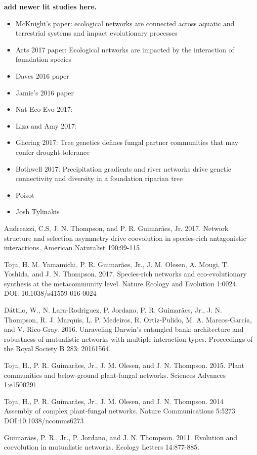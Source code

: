 \documentclass[fleqn,10pt]{wlscirep}
\begin{document}
\textbf{add newer lit studies here.}
\begin{itemize}
\item McKnight's paper: ecological networks are connected across
  aquatic and terrestrial systems and impact evolutionary processes
\item Arts 2017 paper: Ecological networks are impacted by the
  interaction of foundation species
\item Daves 2016 paper
\item Jamie's 2016 paper
\item Nat Eco Evo 2017:
\item Liza and Amy 2017: 
\item Ghering 2017: Tree genetics defines fungal partner communities
  that may confer drought tolerance
\item Bothwell 2017: Precipitation gradients and river networks drive
  genetic connectivity and diversity in a foundation riparian tree
\item Poisot
\item Josh Tylinakis

\end{itemize}

Andreazzi, C.S, J. N. Thompson, and P. R. Guimarães, Jr. 2017. Network
structure and selection asymmetry drive coevolution in species-rich
antagonistic interactions. American Naturalist 190:99-115

Toju, H. M. Yamamichi, P. R. Guimarães, Jr., J. M. Olesen, A. Mougi,
T. Yoshida, and J. N. Thompson. 2017. Species-rich networks and
eco-evolutionary synthesis at the metacommunity level. Nature Ecology
and Evolution 1:0024. DOI: 10.1038/s41559-016-0024

Dáttilo, W., N. Lara-Rodriguez, P. Jordano, P. R. Guimarães, Jr.,
J. N. Thompson, R. J. Marquis, L. P. Medeiros, R. Ortiz-Pulido,
M. A. Marcos-García, and V. Rico-Gray. 2016. Unraveling Darwin's
entangled bank: architecture and robustness of mutualistic networks
with multiple interaction types. Proceedings of the Royal Society B
283: 20161564.

Toju, H., P. R. Guimarães, Jr., J. M. Olesen, and
J. N. Thompson. 2015. Plant communities and below-ground plant-fungal
networks. Sciences Advances 1:e1500291

Toju, H., P. R. Guimarães, Jr., J. M. Olesen, and J. N. Thompson. 2014
Assembly of complex plant-fungal networks. Nature Communications
5:5273 DOI:10.1038/ncomms6273

Guimarães, P. R., Jr., P. Jordano, and J. N. Thompson. 2011. Evolution
and coevolution in mutualistic networks. Ecology Letters 14:877-885.
\end{document}
